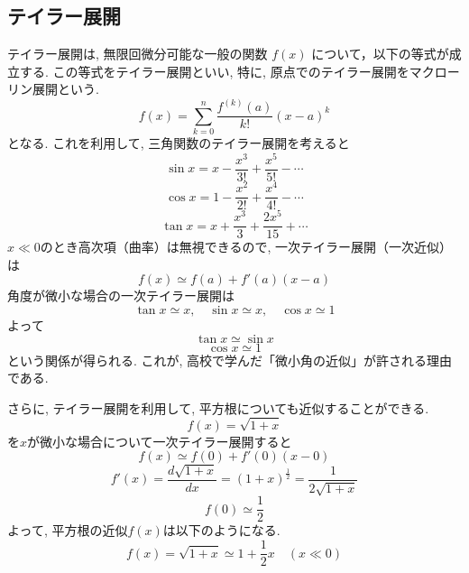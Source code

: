 \documentclass{ltjsarticle}
\begin{document}
\subsection*{テイラー展開}
テイラー展開は, 無限回微分可能な一般の関数 $f(x)$ について，以下の等式が成立する. 
この等式をテイラー展開といい,  特に, 原点でのテイラー展開をマクローリン展開という. 
\begin{equation}
  f(x) = \sum_{k=0}^n \frac{f^{(k)}(a)}{k!} (x - a)^k
\end{equation}
となる. これを利用して, 三角関数のテイラー展開を考えると
\begin{equation}
  \sin x = x - \frac{x^3}{3!} + \frac{x^5}{5!} - \cdots 
\end{equation}
\begin{equation}
  \cos x = 1 - \frac{x^2}{2!} + \frac{x^4}{4!} - \cdots
\end{equation}
\begin{equation}
  \tan x = x + \frac{x^3}{3} + \frac{2x^5}{15} + \cdots
\end{equation}
$x \ll 0$のとき高次項（曲率）は無視できるので, 一次テイラー展開（一次近似）は
\begin{equation}
  f(x) \simeq f(a) + f'(a)(x - a)
\end{equation}
角度が微小な場合の一次テイラー展開は
\begin{equation}
  \tan x \simeq x, \quad \sin x \simeq x, \quad \cos x \simeq 1
\end{equation}
よって
\begin{equation}
  \tan x \simeq \sin x
\end{equation}
\begin{equation}
  \cos x \simeq 1
\end{equation}
という関係が得られる. これが, 高校で学んだ「微小角の近似」が許される理由である.

さらに, テイラー展開を利用して, 平方根についても近似することができる. 
\begin{equation}
  f(x) = \sqrt{1 + x }
\end{equation}
を$x$が微小な場合について一次テイラー展開すると
\begin{equation}
  f(x) \simeq f(0) + f'(0)(x - 0)
\end{equation}
\begin{equation}
  f'(x) = \frac{d \sqrt{1 + x}}{dx} = (1 + x)^{\frac{1}{2}} = \frac{1}{2 \sqrt{1 + x}}
\end{equation}
\begin{equation}
  f(0) \simeq \frac{1}{2}
\end{equation}
よって, 平方根の近似$f(x)$は以下のようになる. 
\begin{equation}
  f(x) = \sqrt{1 + x } \simeq 1 + \frac{1}{2} x \quad (x \ll 0)
\end{equation}
\end{document}
